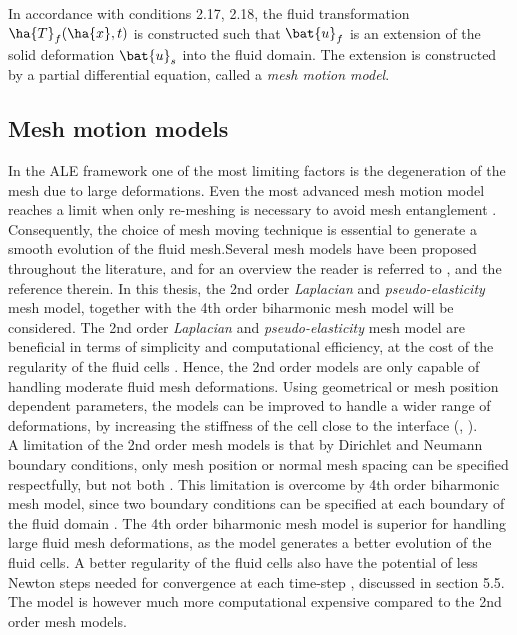 In accordance with conditions 2.17, 2.18, the fluid transformation $\ha{T}_f(\ha{x}, t) $ is constructed such that $\bat{u}_f$ is an extension of the solid deformation $\bat{u}_s$ into the fluid domain. The extension is constructed by a partial differential equation, called a \textit{mesh motion model}. 

\subsection{Mesh motion models}

In the ALE framework one of the most limiting factors is the degeneration of the mesh due to large deformations. Even the most advanced mesh motion model  reaches a limit when only re-meshing is necessary to avoid mesh entanglement \cite{Wall12006}. Consequently, the choice of  mesh moving technique is essential to generate a smooth evolution of the fluid mesh.Several mesh models have been proposed throughout the literature, and for an overview the reader is referred to \cite{MM2016}, and the reference therein. 
In this thesis, the 2nd order \textit{Laplacian} and \textit{pseudo-elasticity} mesh model, together with the 4th order biharmonic mesh model will be considered.  The 2nd order \textit{Laplacian} and \textit{pseudo-elasticity} mesh model are beneficial in terms of simplicity and computational efficiency, at the cost of the  regularity of the fluid cells  \cite{Wick2011}. Hence, the 2nd order models are only capable of handling moderate fluid mesh deformations. Using geometrical or mesh position dependent parameters, the models can be improved to handle a wider range of deformations, by increasing the stiffness of the cell close to the interface (\cite{Hsu}, \cite{Dwight}). \\
A limitation of the 2nd order mesh models is that by Dirichlet and Neumann boundary conditions, only mesh position or normal mesh spacing can be specified respectfully, but not both  \cite{Helenbrook2003}. This limitation is overcome by 4th order biharmonic mesh model, since two boundary conditions can be specified at each boundary of the fluid domain \cite{Helenbrook2003}. The 4th order biharmonic mesh model is superior for  handling large  fluid mesh deformations, as the model generates a better evolution of the fluid cells. A better regularity of the fluid cells also have the potential of less Newton steps needed for convergence at each time-step \cite{Wick2011}, discussed in section 5.5. The model is however much more computational expensive compared to the 2nd order mesh models. 


